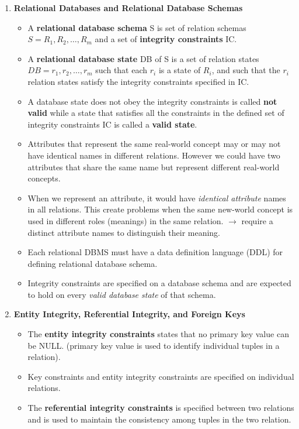 \documentclass[10pt]{article}
\begin{document}
\begin{enumerate}
	\item \textbf{Relational Databases and Relational Database Schemas}
	\begin{itemize}
		\item A \textbf{relational database schema} S is set of relation schemas $S = {R_1, R_2,\ldots, R_m}$ and a set of \textbf{integrity constraints} IC.
		\item A \textbf{relational database state} DB of S is a set of relation states $DB = {r_1, r_2,\ldots, r_m}$ such that each $r_i$ is a state of $R_i$, and such that the $r_i$ relation states satisfy the integrity constraints specified in IC. 
		\item A database state does not obey the integrity constraints is called \textbf{not valid} while a state that satisfies all the constraints in the defined set of integrity constraints IC is called a \textbf{valid state}.
		\item Attributes that represent the same real-world concept may or may not have identical names in different relations. However we could have two attributes that share the same name but represent different real-world concepts.
		\item When we represent an attribute, it would have \textit{identical attribute} names in all relations. This create problems when the same new-world concept is used in different roles (meanings) in the same relation. $\rightarrow$ require a distinct attribute names to distinguish their meaning.
		\item Each relational DBMS must have a data definition language (DDL) for defining relational database schema.
		\item Integrity constraints are specified on a database schema and are expected to hold on every \textit{valid database state} of that schema. 
	\end{itemize}

	\item \textbf{Entity Integrity, Referential Integrity, and Foreign Keys}
	\begin{itemize}
		\item The \textbf{entity integrity constraints} states that no primary key value can be NULL. (primary key value is used to identify individual tuples in a relation).
		\item Key constraints and entity integrity constraints are specified on individual relations.
		\item The \textbf{referential integrity constraints} is specified between two relations and is used to maintain the consistency among tuples in the two relation.
	\end{itemize}
\end{enumerate}
\end{document}
